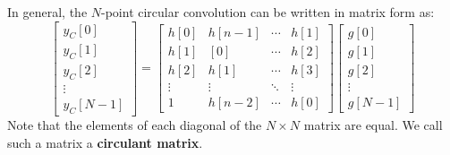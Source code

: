\documentclass[../../main/main.tex]{subfiles}
\begin{document}
\medskip
{}
In general, the \( N \)-point circular convolution can be written in matrix form as:
\begin{equation}
    \begin{bmatrix}
        y_{C}[0]    \\
        y_{C}[1]    \\
        y_{C}[2]    \\
        \vdots      \\
        y_{C}[N-1]
    \end{bmatrix}
    =
    \begin{bmatrix}
        h[0]    &   h[n-1]  &   \cdots  &   h[1]    \\
        h[1]    &   [0]     &   \cdots  &   h[2]    \\
        h[2]    &   h[1]    &   \cdots  &   h[3]    \\
        \vdots  &   \vdots  &   \ddots  &   \vdots  \\
        1       &   h[n-2]  &   \cdots  &   h[0]
    \end{bmatrix}
    \begin{bmatrix}
        g[0]    \\
        g[1]    \\
        g[2]    \\
        \vdots  \\
        g[N-1]
    \end{bmatrix}
    \label{eq:L12_S58_1}
\end{equation}
Note that the elements of each diagonal of the \( N \times N \) matrix are equal. We call such a matrix a \textbf{circulant matrix}.
\end{document}
